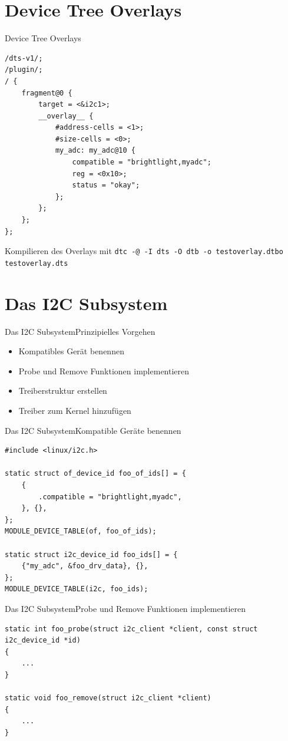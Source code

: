 \documentclass[aspectratio=169]{beamer}
\begin{document}
\section{Device Tree Overlays}
\begin{frame}[fragile]{Device Tree Overlays}
	\begin{lstlisting}
/dts-v1/;
/plugin/;
/ {
	fragment@0 {
		target = <&i2c1>;
		__overlay__ {
			#address-cells = <1>;
			#size-cells = <0>;
			my_adc: my_adc@10 {
				compatible = "brightlight,myadc";
				reg = <0x10>;
				status = "okay";
			};
		};
	};
};
	\end{lstlisting}
	Kompilieren des Overlays mit \lstinline|dtc -@ -I dts -O dtb -o testoverlay.dtbo testoverlay.dts|
\end{frame}

\section{Das I2C Subsystem}
\begin{frame}[fragile]{Das I2C Subsystem}{Prinzipielles Vorgehen}
	\begin{itemize}
		\item Kompatibles Gerät benennen
		\item Probe und Remove Funktionen implementieren
		\item Treiberstruktur erstellen
		\item Treiber zum Kernel hinzufügen
	\end{itemize}
\end{frame}

\begin{frame}[fragile]{Das I2C Subsystem}{Kompatible Geräte benennen}
	\begin{lstlisting}
#include <linux/i2c.h>

static struct of_device_id foo_of_ids[] = {
	{
		.compatible = "brightlight,myadc",
	}, {},
};
MODULE_DEVICE_TABLE(of, foo_of_ids);

static struct i2c_device_id foo_ids[] = {
	{"my_adc", &foo_drv_data}, {},
};
MODULE_DEVICE_TABLE(i2c, foo_ids);
	\end{lstlisting}
\end{frame}

\begin{frame}[fragile]{Das I2C Subsystem}{Probe und Remove Funktionen implementieren}
	\begin{lstlisting}
static int foo_probe(struct i2c_client *client, const struct i2c_device_id *id)
{
	...
}

static void foo_remove(struct i2c_client *client)
{
	...
}

	\end{lstlisting}
\end{frame}
\end{document}
